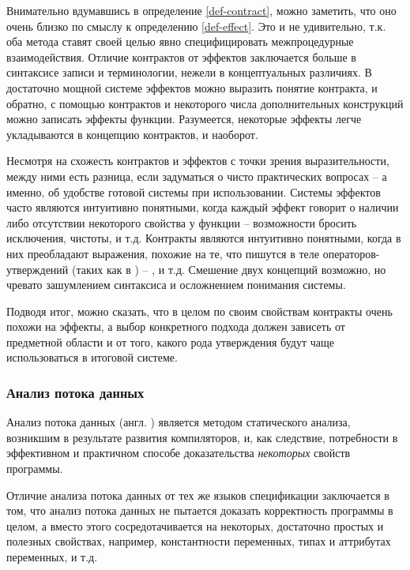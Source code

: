 Внимательно вдумавшись в определение \ref{def-contract}, можно заметить, что оно очень близко по смыслу к определению \ref{def-effect}. Это и не удивительно, т.к. оба метода ставят своей целью явно специфицировать межпроцедурные взаимодействия.  Отличие контрактов от эффектов заключается больше в синтаксисе записи и терминологии, нежели в концептуальных различиях. В достаточно мощной системе эффектов можно выразить понятие контракта, и обратно, с помощью контрактов и некоторого числа дополнительных конструкций можно записать эффекты функции. Разумеется, некоторые эффекты легче укладываются в концепцию контрактов, и наоборот. 

Несмотря на схожесть контрактов и эффектов с точки зрения выразительности, между ними есть разница, если задуматься о чисто практических вопросах -- а именно, об удобстве готовой системы при использовании. Системы эффектов часто являются интуитивно понятными, когда каждый эффект говорит о наличии либо отсутствии некоторого свойства у функции -- возможности бросить исключения, чистоты, и т.д. Контракты являются интуитивно понятными, когда в них преобладают выражения, похожие на те, что пишутся в теле операторов-утверждений (таких как  в ) -- ,  и т.д. Смешение двух концепций возможно, но чревато зашумлением синтаксиса и осложнением понимания системы. 

Подводя итог, можно сказать, что в целом по своим свойствам контракты очень похожи на эффекты, а выбор конкретного подхода должен зависеть от предметной области и от того, какого рода утверждения будут чаще использоваться в итоговой системе. 






\subsubsection{Анализ потока данных}

Анализ потока данных (англ. ) является методом статического анализа, возникшим в результате развития компиляторов, и, как следствие, потребности в эффективном и практичном способе доказательства \emph{некоторых} свойств программы.

Отличие анализа потока данных от тех же языков спецификации заключается в том, что анализ потока данных не пытается доказать корректность программы в целом, а вместо этого сосредотачивается на некоторых, достаточно простых и полезных свойствах, например, константности переменных, типах и аттрибутах переменных, и т.д. \cite{Sharir78}

